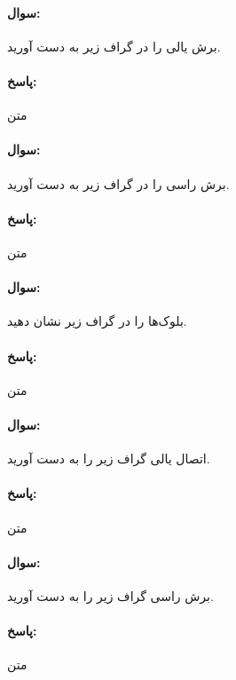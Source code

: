 \documentclass[a4paper,10pt]{article}
\begin{document}
    \noindent\hrulefill

    \paragraph{سوال:} برش یالی را در گراف زیر به دست آورید.

    \paragraph{پاسخ:} متن

    \noindent\hrulefill

    \paragraph{سوال:} برش راسی را در گراف زیر به دست آورید.

    \paragraph{پاسخ:} متن

    \noindent\hrulefill

    \paragraph{سوال:} بلوک‌ها را در گراف زیر نشان دهید.

    \paragraph{پاسخ:} متن

    \noindent\hrulefill

    \paragraph{سوال:} اتصال یالی گراف زیر را به دست آورید.

    \paragraph{پاسخ:} متن

    \noindent\hrulefill

    \paragraph{سوال:} برش راسی گراف زیر را به دست آورید.

    \paragraph{پاسخ:} متن
\end{document}
